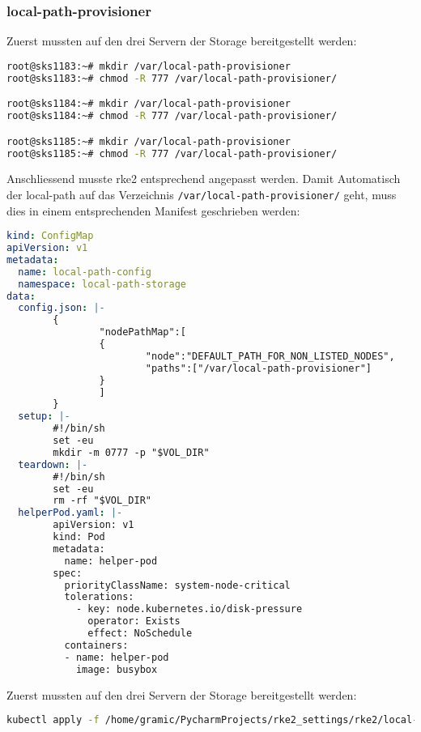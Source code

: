 \subsubsection{local-path-provisioner}
Zuerst mussten auf den drei Servern der Storage bereitgestellt werden:
\lstset{style=gra_codestyle}
\begin{lstlisting}[language=bash, caption=local-path-storage auf Linux Bereitstellen,captionpos=b,label={lst:local-path-storage-provide},breaklines=true]
root@sks1183:~# mkdir /var/local-path-provisioner
root@sks1183:~# chmod -R 777 /var/local-path-provisioner/

root@sks1184:~# mkdir /var/local-path-provisioner
root@sks1184:~# chmod -R 777 /var/local-path-provisioner/

root@sks1185:~# mkdir /var/local-path-provisioner
root@sks1185:~# chmod -R 777 /var/local-path-provisioner/
\end{lstlisting}

Anschliessend musste rke2 entsprechend angepasst werden.
Damit Automatisch der local-path auf das Verzeichnis \texttt{/var/local-path-provisioner/} geht, muss dies in einem entsprechenden Manifest geschrieben werden:
\lstset{style=gra_codestyle}
\begin{lstlisting}[language=yaml, caption=local-path-provisioner definieren,captionpos=b,label={lst:local-path-provisioner.yaml},breaklines=true]
kind: ConfigMap
apiVersion: v1
metadata:
  name: local-path-config
  namespace: local-path-storage
data:
  config.json: |-
        {
                "nodePathMap":[
                {
                        "node":"DEFAULT_PATH_FOR_NON_LISTED_NODES",
                        "paths":["/var/local-path-provisioner"]
                }
                ]
        }
  setup: |-
        #!/bin/sh
        set -eu
        mkdir -m 0777 -p "$VOL_DIR"
  teardown: |-
        #!/bin/sh
        set -eu
        rm -rf "$VOL_DIR"
  helperPod.yaml: |-
        apiVersion: v1
        kind: Pod
        metadata:
          name: helper-pod
        spec:
          priorityClassName: system-node-critical
          tolerations:
            - key: node.kubernetes.io/disk-pressure
              operator: Exists
              effect: NoSchedule
          containers:
          - name: helper-pod
            image: busybox
\end{lstlisting}


Zuerst mussten auf den drei Servern der Storage bereitgestellt werden:
\lstset{style=gra_codestyle}
\begin{lstlisting}[language=bash, caption=local-path-storage aktualisieren,captionpos=b,label={lst:local-path-storage-apply},breaklines=true]
kubectl apply -f /home/gramic/PycharmProjects/rke2_settings/rke2/local-path-provisioner.yaml
\end{lstlisting}


